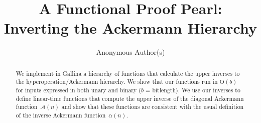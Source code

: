 \documentclass[runningheads]{llncs}
\title{A Functional Proof Pearl: \protect\\ Inverting the Ackermann Hierarchy}
\newcommand{\bigO}{\text{O}}
\newcommand{\Ack}{\ensuremath{\mathcal{A}}}
\begin{document}
\author{Anonymous Author(s)}

%


\maketitle








\begin{abstract}
\vspace{-2em}
We implement in Gallina a hierarchy of functions that calculate
the upper inverses to the hyperoperation/Ackermann hierarchy.
We show that our functions run in $\bigO(b)$ for inputs expressed
in both unary and binary ($b$ = bitlength). We use our inverses
to define linear-time functions that compute the upper inverse of the diagonal
Ackermann \linebreak[3] function~$\Ack(n)$ and show that these functions are consistent with the usual definition of the inverse
Ackermann function~$\alpha(n)$.
\end{abstract}
\end{document}
